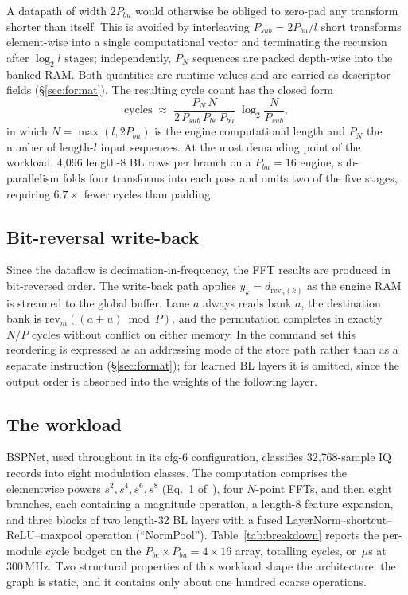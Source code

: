 \documentclass[twocolumn,10pt]{article}
\newcommand{\Pbu}{P_{bu}}
\newcommand{\Pbe}{P_{be}}
\newcommand{\Psub}{P_{sub}}
\newcommand{\PN}{P_{N}}
\begin{document}
A datapath of width $2\Pbu$ would otherwise be obliged to zero-pad any transform
shorter than itself.  This is avoided by interleaving $\Psub = 2\Pbu / l$ short
transforms element-wise into a single computational vector and terminating the
recursion after $\log_2 l$ stages; independently, $\PN$ sequences are packed
depth-wise into the banked RAM.  Both quantities are runtime values and are
carried as descriptor fields (\S\ref{sec:format}).  The resulting cycle count
has the closed form
\begin{equation}
\text{cycles} \;\approx\; \frac{\PN\, N}{2\,\Psub\, \Pbe\, \Pbu}\;
             \log_2 \frac{N}{\Psub},
\label{eq:cycles}
\end{equation}
in which $N = \max(l, 2\Pbu)$ is the engine computational length and $\PN$ the
number of length-$l$ input sequences.  At the most demanding point of the
workload, 4{,}096 length-8 BL rows per branch on a $\Pbu{=}16$ engine,
sub-parallelism folds four transforms into each pass and omits two of the five
stages, requiring $6.7\times$ fewer cycles than padding.

\subsection{Bit-reversal write-back}\label{sec:brev}

Since the dataflow is decimation-in-frequency, the FFT results are produced in
bit-reversed order.  The write-back path applies $y_k = d_{\mathrm{rev}_n(k)}$
as the engine RAM is streamed to the global buffer.  Lane $a$ always reads bank
$a$, the destination bank is $\mathrm{rev}_m((a{+}u)\bmod P)$, and the
permutation completes in exactly $N/P$ cycles without conflict on either memory.
In the command set this reordering is expressed as an addressing mode of the
store path rather than as a separate instruction (\S\ref{sec:format}); for
learned BL layers it is omitted, since the output order is absorbed into the
weights of the following layer.

\subsection{The workload}\label{sec:workload}

BSPNet, used throughout in its cfg-6 configuration, classifies 32{,}768-sample
IQ records into eight modulation classes.  The computation comprises the
elementwise powers $s^2,s^4,s^6,s^8$ (Eq.~1 of~\cite{flexbe}), four $N$-point
FFTs, and then eight branches, each containing a magnitude operation, a length-8
feature expansion, and three blocks of two length-32 BL layers with a fused
LayerNorm--shortcut--ReLU--maxpool operation (``NormPool'').
Table~\ref{tab:breakdown} reports the per-module cycle budget on the
$\Pbe{\times}\Pbu = 4{\times}16$ array, totalling \CfgCycles{} cycles, or
\CfgUs\,$\mu$s at 300\,MHz.  Two structural properties of this workload shape
the architecture: the graph is static, and it contains only about one hundred
coarse operations.
\end{document}
